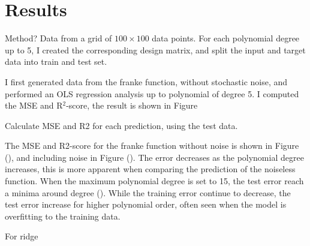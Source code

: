 \section{Results}\label{sec:results}
Method? Data from a grid of $100 \times 100$ data points. For each polynomial degree up to 5, I created the corresponding design matrix, and split the input and target data into train and test set.

I first generated data from the franke function, without stochastic noise, and performed an OLS regression analysis up to polynomial of degree 5. I computed the MSE and R$^{2}$-score, the result is shown in Figure 

Calculate MSE and R2 for each prediction, using the test data.

The MSE and R2-score for the franke function without noise is shown in Figure (), and including noise in Figure (). The error decreases as the polynomial degree increases, this is more apparent when comparing the prediction of the noiseless function. When the maximum polynomial degree is set to 15, the test error reach a minima around degree (). While the training error continue to decrease, the test error increase for higher polynomial order, often seen when the model is overfitting to the training data.

For ridge